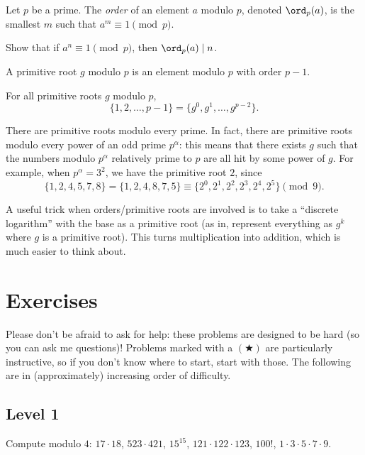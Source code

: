 \documentclass[11pt]{scrartcl}
\begin{document}
Let $p$ be a prime. The \emph{order} of an element $a$ modulo $p$, denoted $\ord_p(a)$, is the smallest $m$ such that $a^m \equiv 1 \pmod p$.

\begin{exercise}
	Show that if $a^n \equiv 1 \pmod p$, then $\ord_p(a) \mid n$.
\end{exercise}

A primitive root $g$ modulo $p$ is an element modulo $p$ with order $p - 1$.

\begin{exercise}
	For all primitive roots $g$ modulo $p$,
	\[\{1,2,\dots,p - 1\} = \{g^0,g^1,\dots,g^{p - 2}\}.\]
\end{exercise}

There are primitive roots modulo every prime. In fact, there are primitive roots modulo every power of an odd prime $p^\alpha$: this means that there exists $g$ such that the numbers modulo $p^\alpha$ relatively prime to $p$ are all hit by some power of $g$. For example, when $p^\alpha = 3^2$, we have the primitive root $2$, since
\[\{1,2,4,5,7,8\} = \{1,2,4,8,7,5\} \equiv \{2^0,2^1,2^2,2^3,2^4,2^5\} \pmod 9.\]

A useful trick when orders/primitive roots are involved is to take a ``discrete logarithm'' with the base as a primitive root (as in, represent everything as $g^k$ where $g$ is a primitive root). This turns multiplication into addition, which is much easier to think about.

\pagebreak

\section{Exercises}

Please don't be afraid to ask for help: these problems are designed to be hard (so you can ask me questions)! Problems marked with a $(\bigstar)$ are particularly instructive, so if you don't know where to start, start with those. The following are in (approximately) increasing order of difficulty.

\subsection{Level 1}\label{subsec:easy}

\begin{exercise}
	Compute modulo $4$: $17 \cdot 18$, $523 \cdot 421$, $15^{15}$, $121 \cdot 122 \cdot 123$, $100!$, $1 \cdot 3 \cdot 5 \cdot 7 \cdot 9$. %
\end{exercise}
\end{document}
